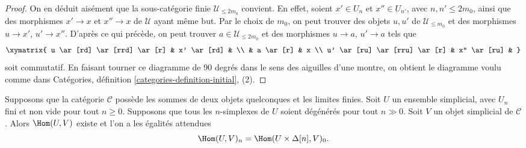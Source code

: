 \begin{proof}
\medskip\noindent
On en déduit aisément que la sous-catégorie finie
$\mathcal{U}_{\leq 2m_0}$ convient. En effet, soient
$x' \in U_n$ et $x'' \in U_{n'}$, avec $n, n' \leq 2m_0$, ainsi que
des morphismes $x' \to x$ et $x'' \to x$ de $\mathcal{U}$
ayant même but. Par le choix de $m_0$, on peut trouver des objets
$u, u'$ de $\mathcal{U}_{\leq m_0}$ et des morphismes
$u \to x'$, $u' \to x''$.
D'après ce qui précède, on peut trouver $a \in \mathcal{U}_{\leq 2m_0}$
et des morphismes $u \to a$, $u' \to a$ tels que
$$
\xymatrix{
u \ar[rd] \ar[rrd] \ar[r] & x' \ar[rd] & \\
& a \ar[r] & x \\
u' \ar[ru] \ar[rru] \ar[r] & x'' \ar[ru] &
}
$$
soit commutatif. En faisant tourner ce diagramme de 90 degrés dans le
sens des aiguilles d'une montre, on obtient le diagramme voulu comme
dans Catégories, définition \ref{categories-definition-initial}, (2).
\end{proof}

\begin{lemma}
\label{lemma-exists-hom-from-simplicial-set-finite}
Supposons que la catégorie $\mathcal{C}$ possède les sommes de deux
objets quelconques et les limites finies. Soit $U$ un ensemble simplicial,
avec $U_n$ fini et non vide pour tout $n \geq 0$. Supposons que tous les
$n$-simplexes de $U$ soient dégénérés pour tout $n \gg 0$.
Soit $V$ un objet simplicial de $\mathcal{C}$.
Alors $\Hom(U, V)$ existe et l'on a les égalités attendues
$$
\Hom(U, V)_n = \Hom(U \times \Delta[n], V)_0.
$$
\end{lemma}

